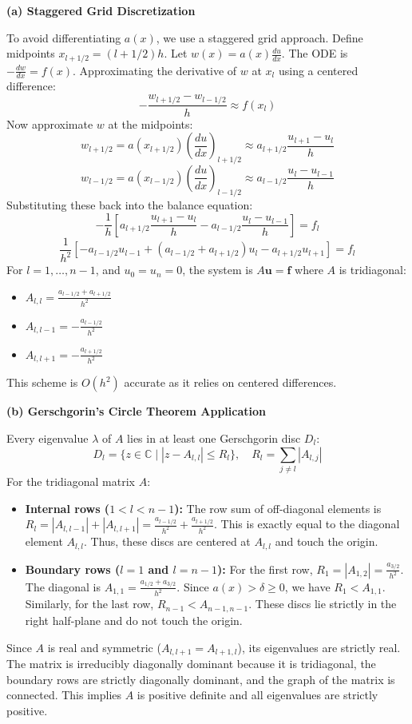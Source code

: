 \begin{solution}
\textbf{(a) Staggered Grid Discretization}

To avoid differentiating $a(x)$, we use a staggered grid approach. Define midpoints $x_{l+1/2} = (l+1/2)h$. 
Let $w(x) = a(x) \frac{du}{dx}$. The ODE is $-\frac{dw}{dx} = f(x)$.
Approximating the derivative of $w$ at $x_l$ using a centered difference:
\[ -\frac{w_{l+1/2} - w_{l-1/2}}{h} \approx f(x_l) \]
Now approximate $w$ at the midpoints:
\[ w_{l+1/2} = a(x_{l+1/2}) \left( \frac{du}{dx} \right)_{l+1/2} \approx a_{l+1/2} \frac{u_{l+1} - u_l}{h} \]
\[ w_{l-1/2} = a(x_{l-1/2}) \left( \frac{du}{dx} \right)_{l-1/2} \approx a_{l-1/2} \frac{u_l - u_{l-1}}{h} \]
Substituting these back into the balance equation:
\[ -\frac{1}{h} \left[ a_{l+1/2} \frac{u_{l+1} - u_l}{h} - a_{l-1/2} \frac{u_l - u_{l-1}}{h} \right] = f_l \]
\[ \frac{1}{h^2} \left[ -a_{l-1/2} u_{l-1} + (a_{l-1/2} + a_{l+1/2}) u_l - a_{l+1/2} u_{l+1} \right] = f_l \]
For $l = 1, \dots, n-1$, and $u_0 = u_n = 0$, the system is $A \mathbf{u} = \mathbf{f}$ where $A$ is tridiagonal:
\begin{itemize}
    \item $A_{l,l} = \frac{a_{l-1/2} + a_{l+1/2}}{h^2}$
    \item $A_{l,l-1} = -\frac{a_{l-1/2}}{h^2}$
    \item $A_{l,l+1} = -\frac{a_{l+1/2}}{h^2}$
\end{itemize}
This scheme is $O(h^2)$ accurate as it relies on centered differences.

\textbf{(b) Gerschgorin's Circle Theorem Application}

Every eigenvalue $\lambda$ of $A$ lies in at least one Gerschgorin disc $D_l$:
\[ D_l = \{ z \in \mathbb{C} \mid |z - A_{l,l}| \leq R_l \}, \quad R_l = \sum_{j \neq l} |A_{l,j}| \]
For the tridiagonal matrix $A$:
\begin{itemize}
    \item \textbf{Internal rows ($1 < l < n-1$):} The row sum of off-diagonal elements is $R_l = |A_{l,l-1}| + |A_{l,l+1}| = \frac{a_{l-1/2}}{h^2} + \frac{a_{l+1/2}}{h^2}$. This is exactly equal to the diagonal element $A_{l,l}$. Thus, these discs are centered at $A_{l,l}$ and touch the origin.
    \item \textbf{Boundary rows ($l=1$ and $l=n-1$):} For the first row, $R_1 = |A_{1,2}| = \frac{a_{3/2}}{h^2}$. The diagonal is $A_{1,1} = \frac{a_{1/2} + a_{3/2}}{h^2}$. Since $a(x) > \delta \geq 0$, we have $R_1 < A_{1,1}$. Similarly, for the last row, $R_{n-1} < A_{n-1,n-1}$. These discs lie strictly in the right half-plane and do not touch the origin.
\end{itemize}
Since $A$ is real and symmetric ($A_{l,l+1} = A_{l+1,l}$), its eigenvalues are strictly real. The matrix is irreducibly diagonally dominant because it is tridiagonal, the boundary rows are strictly diagonally dominant, and the graph of the matrix is connected. This implies $A$ is positive definite and all eigenvalues are strictly positive.


\end{solution}
